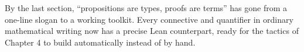 By the last section, ``propositions are types, proofs are terms'' has gone from a one-line slogan to a working toolkit. Every connective and quantifier in ordinary mathematical writing now has a precise Lean counterpart, ready for the tactics of Chapter 4 to build automatically instead of by hand.










